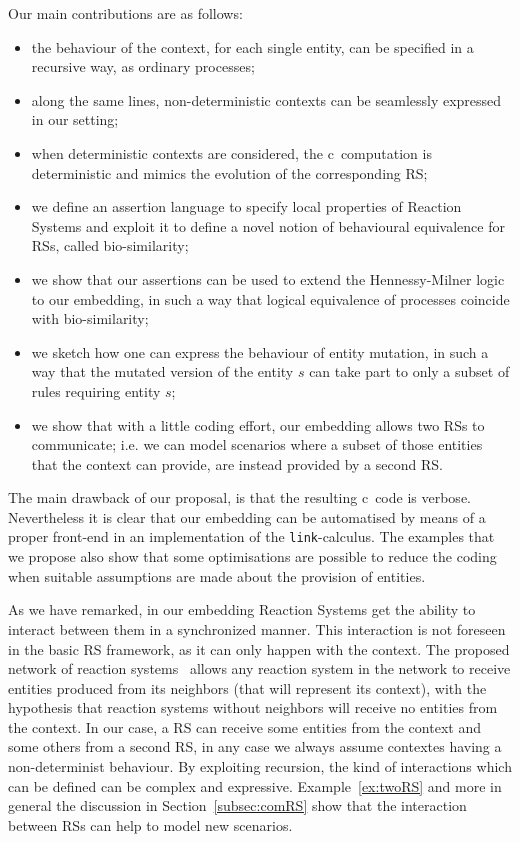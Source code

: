 Our main contributions are as follows:
\begin{itemize}
\item the behaviour of the context, for each single 
entity,
can be
specified in a recursive way, as ordinary processes;
\item along the same lines, non-deterministic contexts can be seamlessly expressed in our setting; 
\item when deterministic contexts are considered, the c\CNA \
computation is deterministic and mimics the evolution of the corresponding RS;
\item we define an assertion language to specify local properties of 
Reaction Systems and exploit it to define a novel notion of behavioural equivalence for 
RSs,
called bio-similarity;
\item we show that our assertions can be used to extend the Hennessy-Milner logic to our 
{\color{red}embedding}, in such a way that logical equivalence of processes coincide with bio-similarity;
\item we sketch how one can express the behaviour of entity mutation,
in such a way that {\color{red} the mutated version of the entity
$s$ can}  take part to only a subset of rules requiring entity $s$;
\item we show that with a little coding effort, our 
{\color{red} embedding}
allows two RSs to
communicate; i.e. we can model scenarios where a subset of those entities that the context  can
provide, are instead provided by a second RS.
\end{itemize}

The main drawback of our proposal, is that the {\color{red} resulting c\CNA \ 
code}
is
verbose. Nevertheless it is clear that our
{\color{red} embedding}
can be automatised by means of a proper front-end in
an implementation of the {\tt link}-calculus. 
The examples that we propose also show that some optimisations are possible
to reduce the coding when suitable assumptions are made about the provision of entities.

As we have remarked, in our 
{\color{red} embedding}
 Reaction Systems 
get the ability to interact between them in a synchronized manner. 
This interaction is not foreseen in
the basic RS framework, as it can only happen with the context.
{\color{red}The proposed network of reaction systems~\cite{BLR20} allows
any reaction system in the network to receive entities 
produced from its neighbors (that will represent its context), with the hypothesis that  
reaction systems without neighbors will receive no entities 
from the context. 
In our case, a RS can receive some entities from the context and some others from a second RS, in any case we always assume contextes having a non-determinist behaviour.
}
By exploiting recursion, the kind of interactions which can be 
defined can be complex and expressive.
Example~\ref{ex:twoRS} and more in general the discussion in 
Section~\ref{subsec:comRS}
 show that 
the interaction between RSs can help to model new scenarios.

